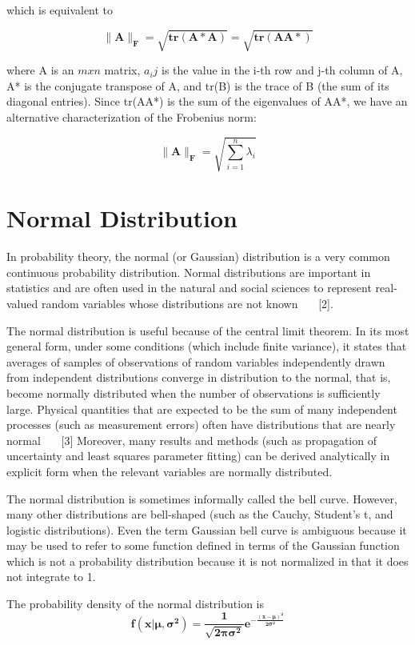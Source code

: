 \documentclass[12pt,notitlepage,oneside]{report}
\begin{document}
which is equivalent to 

$$\pmb{ \parallel A \parallel _F = \sqrt{tr(A*A)} = \sqrt{tr(AA*)} }$$


where A is an $ m x n $ matrix, $a_ij$ is the value in the i-th row and j-th column of A, A* is the conjugate transpose of A, and tr(B) is the trace of B (the sum of its diagonal entries). Since tr(AA*) is the sum of the eigenvalues of AA*, we have an alternative characterization of the Frobenius norm:

$$ \pmb{\parallel A \parallel _F }= \sqrt{\sum_{i=1}^{n}\lambda _i} $$


\section{Normal Distribution}

In probability theory, the normal (or Gaussian) distribution is a very common continuous probability distribution. Normal distributions are important in statistics and are often used in the natural and social sciences to represent real-valued random variables whose distributions are not known \cite{01} \ \ \ [2].

The normal distribution is useful because of the central limit theorem. In its most general form, under some conditions (which include finite variance), it states that averages of samples of observations of random variables independently drawn from independent distributions converge in distribution to the normal, that is, become normally distributed when the number of observations is sufficiently large. Physical quantities that are expected to be the sum of many independent processes (such as measurement errors) often have distributions that are nearly normal  \ \ \  [3]   Moreover, many results and methods (such as propagation of uncertainty and least squares parameter fitting) can be derived analytically in explicit form when the relevant variables are normally distributed.

The normal distribution is sometimes informally called the bell curve. However, many other distributions are bell-shaped (such as the Cauchy, Student's t, and logistic distributions). Even the term Gaussian bell curve is ambiguous because it may be used to refer to some function defined in terms of the Gaussian function which is not a probability distribution because it is not normalized in that it does not integrate to 1.

The probability density of the normal distribution is \cite{normal}
$$\pmb{f(x | \mu , \sigma ^ 2) = \frac{1}{\sqrt{2\pi \sigma ^2}} e^{-\frac{(x-\mu)^2}{2 \sigma ^2}} }$$
\end{document}
